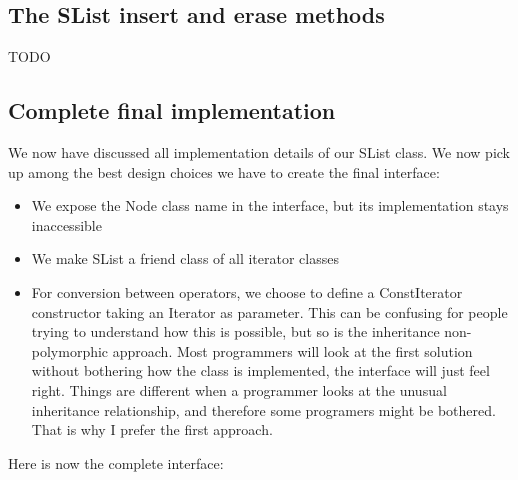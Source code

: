 \subsection{The SList insert and erase methods}
TODO

\subsection{Complete final implementation}
We now have discussed all implementation details of our SList class. We now pick up among the best design choices we have to create the final interface:
\begin{itemize}
\item We expose the Node class name in the interface, but its implementation stays inaccessible
\item We make SList a friend class of all iterator classes
\item For conversion between operators, we choose to define a ConstIterator constructor taking an Iterator as parameter. This can be confusing for people trying to understand how this is possible, but so is the inheritance non-polymorphic approach. Most programmers will look at the first solution without bothering how the class is implemented, the interface will just feel right. Things are different when a programmer looks at the unusual inheritance relationship, and therefore some programers might be bothered. That is why I prefer the first approach.
\end{itemize}
Here is now the complete interface:
